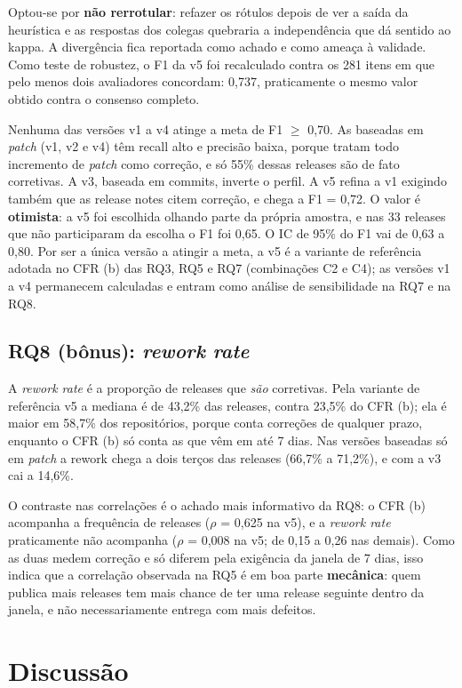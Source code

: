 \documentclass[12pt]{article}
\begin{document}
Optou-se por \textbf{não rerrotular}: refazer os rótulos depois de ver a saída
da heurística e as respostas dos colegas quebraria a independência que dá
sentido ao kappa. A divergência fica reportada como achado e como ameaça à
validade. Como teste de robustez, o F1 da v5 foi recalculado contra os 281
itens em que pelo menos dois avaliadores concordam: 0,737, praticamente o mesmo
valor obtido contra o consenso completo.

Nenhuma das versões v1 a v4 atinge a meta de F1 $\ge$ 0,70. As baseadas em
\emph{patch} (v1, v2 e v4) têm recall alto e precisão baixa, porque tratam todo
incremento de \emph{patch} como correção, e só 55\% dessas releases são de fato
corretivas. A v3, baseada em commits, inverte o perfil. A v5 refina a v1
exigindo também que as release notes citem correção, e chega a F1 = 0,72. O
valor é \textbf{otimista}: a v5 foi escolhida olhando parte da própria amostra,
e nas 33 releases que não participaram da escolha o F1 foi 0,65. O IC de 95\%
do F1 vai de 0,63 a 0,80. Por ser a única versão a atingir a meta, a v5 é a
variante de referência adotada no CFR (b) das RQ3, RQ5 e RQ7 (combinações C2 e
C4); as versões v1 a v4 permanecem calculadas e entram como análise de
sensibilidade na RQ7 e na RQ8.

\subsection{RQ8 (bônus): \emph{rework rate}}

A \emph{rework rate} é a proporção de releases que \emph{são} corretivas. Pela
variante de referência v5 a mediana é de 43,2\% das releases, contra 23,5\% do
CFR (b); ela é maior em 58,7\% dos repositórios, porque conta correções de
qualquer prazo, enquanto o CFR (b) só conta as que vêm em até 7 dias. Nas
versões baseadas só em \emph{patch} a rework chega a dois terços das releases
(66,7\% a 71,2\%), e com a v3 cai a 14,6\%.

O contraste nas correlações é o achado mais informativo da RQ8: o CFR (b)
acompanha a frequência de releases ($\rho$ = 0,625 na v5), e a \emph{rework
rate} praticamente não acompanha ($\rho$ = 0,008 na v5; de 0,15 a 0,26 nas
demais). Como as duas medem correção e só diferem pela exigência da janela de 7
dias, isso indica que a correlação observada na RQ5 é em boa parte
\textbf{mecânica}: quem publica mais releases tem mais chance de ter uma
release seguinte dentro da janela, e não necessariamente entrega com mais
defeitos.

\section{Discussão}
\end{document}
